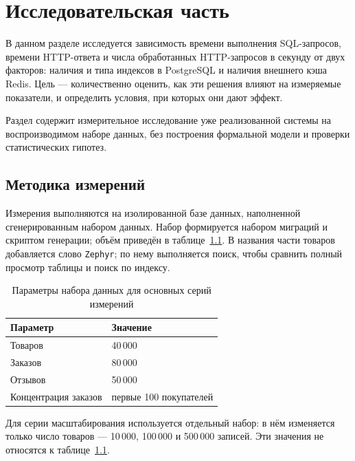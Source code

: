 
\chapter{Исследовательская часть}

В данном разделе исследуется зависимость времени выполнения SQL-запросов, времени HTTP-ответа и числа обработанных HTTP-запросов в секунду от двух факторов: наличия и типа индексов в PostgreSQL и наличия внешнего кэша Redis. Цель --- количественно оценить, как эти решения влияют на измеряемые показатели, и определить условия, при которых они дают эффект.

Раздел содержит измерительное исследование уже реализованной системы на воспроизводимом наборе данных, без построения формальной модели и проверки статистических гипотез.

\section{Методика измерений}

Измерения выполняются на изолированной базе данных, наполненной сгенерированным набором данных. Набор формируется набором миграций и скриптом генерации; объём приведён в таблице~\ref{tbl:research_dataset}. В названия части товаров добавляется слово \texttt{Zephyr}; по нему выполняется поиск, чтобы сравнить полный просмотр таблицы и поиск по индексу.

\begin{table}[H]
    \caption{Параметры набора данных для основных серий измерений}
    \label{tbl:research_dataset}
    \begin{tabular}{|p{}|p{}|}
        \hline
        \textbf{Параметр} & \textbf{Значение} \\ \hline
        Товаров & 40\,000 \\ \hline
        Заказов & 80\,000 \\ \hline
        Отзывов & 50\,000 \\ \hline
        Концентрация заказов & первые 100 покупателей \\ \hline
    \end{tabular}
\end{table}

Для серии масштабирования используется отдельный набор: в нём изменяется только число товаров --- 10\,000, 100\,000 и 500\,000 записей. Эти значения не относятся к таблице~\ref{tbl:research_dataset}.

